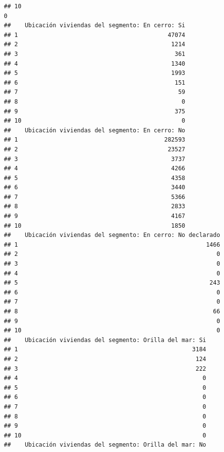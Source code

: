 \documentclass[11pt,]{article}
\begin{document}
\begin{verbatim}
## 10                                                                 0
##    Ubicación viviendas del segmento: En cerro: Si
## 1                                           47074
## 2                                            1214
## 3                                             361
## 4                                            1340
## 5                                            1993
## 6                                             151
## 7                                              59
## 8                                               0
## 9                                             375
## 10                                              0
##    Ubicación viviendas del segmento: En cerro: No
## 1                                          282593
## 2                                           23527
## 3                                            3737
## 4                                            4266
## 5                                            4358
## 6                                            3440
## 7                                            5366
## 8                                            2833
## 9                                            4167
## 10                                           1850
##    Ubicación viviendas del segmento: En cerro: No declarado
## 1                                                      1466
## 2                                                         0
## 3                                                         0
## 4                                                         0
## 5                                                       243
## 6                                                         0
## 7                                                         0
## 8                                                        66
## 9                                                         0
## 10                                                        0
##    Ubicación viviendas del segmento: Orilla del mar: Si
## 1                                                  3184
## 2                                                   124
## 3                                                   222
## 4                                                     0
## 5                                                     0
## 6                                                     0
## 7                                                     0
## 8                                                     0
## 9                                                     0
## 10                                                    0
##    Ubicación viviendas del segmento: Orilla del mar: No

\end{verbatim}
\end{document}
